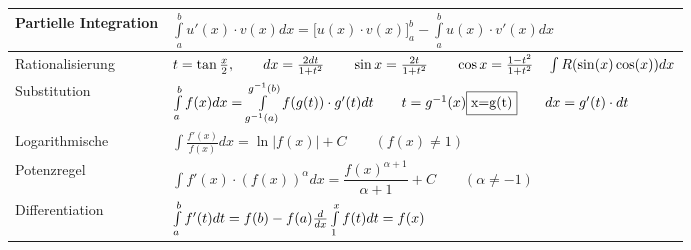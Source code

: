 \begin{table}[h!]
\begin{center}
\begin{tabularx}{540pt}{|p{150pt}|X|}
		Partielle Integration&  $\int\limits_a^b{u'(x)\cdot v(x)dx}=\biggl[ u(x)\cdot v(x) \biggr]_a^b
	 	   -\int\limits_a^b{u(x)\cdot v'(x)dx}$  \\
		\hline
		Rationalisierung& $ t=\tan\frac{x}{2}, \qquad dx=\frac{2dt}{1+t^2} \qquad 
		 	   \sin  x=\frac{2t}{1+t^2} \qquad  \cos x=\frac{1-t^2}{1+t^2}
		 	   \newline  \quad\int{R(\sin(x)\cos(x))dx}$ \\
		\hline
		Substitution& $\int\limits_{a}^{b}{f(x)dx}=\int\limits_{g^{-1}(a)}^{g^{-1}(b)}{f(g(t))\cdot
			g'(t)dt}\qquad t=g^{-1}(x)\qquad 
			\newline \fbox{x=g(t)}\qquad dx=g'(t)\cdot dt$ \\
		\hline
		Logarithmische& $ \int{\frac{f'(x)}{f(x)}dx}=\ln|f(x)|+C	\qquad{(f(x)\neq 1)}$ \\
		\hline
		Potenzregel& $\int{f'(x)\cdot (f(x))^{\alpha} dx}= \dfrac{f(x)^{\alpha +1}}{\alpha+1}+C \qquad{(\alpha \neq -1)}$ \\
		\hline
		Differentiation&$\int \limits ^{b} _{a} {f'(t)dt}=f(b)-f(a)
					\newline   \frac{d}{dx} \int \limits ^{x} _{1} {f(t)dt}=f(x)$\\
		\hline
\end{tabularx}
\end{center}
\end{table}


